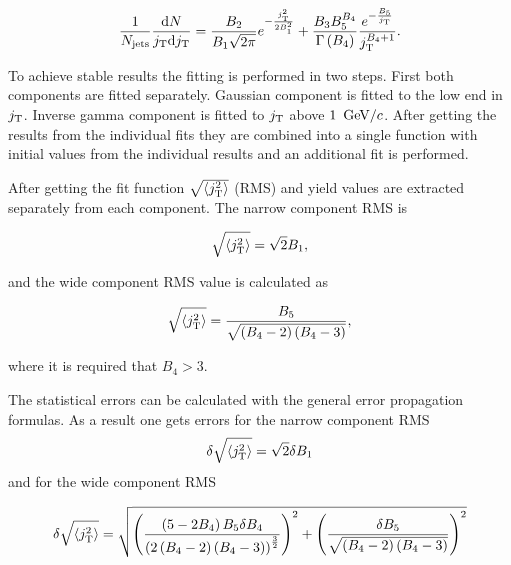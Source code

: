 \begin{equation}
\frac{1}{N_{\mathrm{jets}}}\frac{\mathrm{d}N}{j_{\rm T} \mathrm{d}j_{\rm T}} = \frac{B_2}{B_1\sqrt{2\pi}}e^{-\frac{j_{\rm T}^2}{2B_1^2}}+\frac{B_3B_5^{B_4}}{\Gamma\left(B_4\right)}\frac{e^{-\frac{B_5}{j_{\rm T}}}}{j_{\rm T}^{B_4+1}}.
\label{eq:fit}
\end{equation}

To achieve stable results the fitting is performed in two steps. First both components are fitted separately. Gaussian component is fitted to the low end in $j_{\rm T}$. Inverse gamma component is fitted to $j_{\rm T}$ above $\unit[1]{\gevc}$. After getting the results from the individual fits they are combined into a single function with initial values from the individual results and an additional fit is performed. 

After getting the fit function $\sqrt{\left<j_{\rm T}^2\right>}$ (RMS) and yield values are extracted separately from each component. The narrow component RMS is

$$\sqrt{\left<j_{\rm T}^2\right>}=\sqrt{2}B_1,$$

\noindent and the wide component RMS value is calculated as 

$$\sqrt{\left<j_{\rm T}^2\right>}=\frac{B_5}{\sqrt{\left(B_4-2\right)\left(B_4-3\right)}},$$

\noindent where it is required that $B_4 > 3$.

The statistical errors can be calculated with the general error propagation formulas. As a result one gets errors for the narrow component RMS
\nobreak
\begin{equation}
\delta \sqrt{\left<j_{\rm T}^2\right>} = \sqrt{2}\delta B_1
\end{equation}
\noindent and for the wide component RMS

\begin{equation}
\delta \sqrt{\left<j_{\rm T}^2\right>} = \sqrt{ \left( \frac{\left(5-2 B_4 \right) B_5 \delta  B_4}{\left( 2\left(  B_4-2\right)\left( B_4-3\right)      \right)^{\frac{3}{2}}}\right)^2 + \left( \frac{\delta B_5}{\sqrt{\left( B_4-2\right)\left( B_4-3\right)}}      \right)^2  }
\end{equation}



